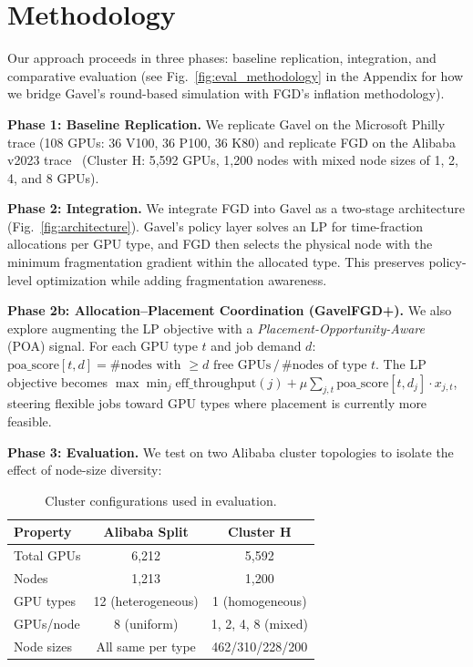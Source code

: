 \documentclass[conference]{IEEEtran}
\begin{document}
\section{Methodology}

Our approach proceeds in three phases: baseline replication, integration, and comparative evaluation (see Fig.~\ref{fig:eval_methodology} in the Appendix for how we bridge Gavel's round-based simulation with FGD's inflation methodology).

\textbf{Phase 1: Baseline Replication.}
We replicate Gavel on the Microsoft Philly trace (108 GPUs: 36 V100, 36 P100, 36 K80) and replicate FGD on the Alibaba v2023 trace~\cite{ALIBABA} (Cluster H: 5,592 GPUs, 1,200 nodes with mixed node sizes of 1, 2, 4, and 8 GPUs).

\textbf{Phase 2: Integration.}
We integrate FGD into Gavel as a two-stage architecture (Fig.~\ref{fig:architecture}).
Gavel's policy layer solves an LP for time-fraction allocations per GPU type, and FGD then selects the physical node with the minimum fragmentation gradient within the allocated type.
This preserves policy-level optimization while adding fragmentation awareness.

\textbf{Phase 2b: Allocation--Placement Coordination (GavelFGD+).}
We also explore augmenting the LP objective with a \textit{Placement-Opportunity-Aware} (POA) signal.
For each GPU type $t$ and job demand $d$:
$\text{poa\_score}[t,d] = {\#\text{nodes with } \ge d \text{ free GPUs}}\,/\,{\#\text{nodes of type } t}$.
The LP objective becomes
$\max \min_j \text{eff\_throughput}(j) + \mu \sum_{j,t} \text{poa\_score}[t,d_j] \cdot x_{j,t}$,
steering flexible jobs toward GPU types where placement is currently more feasible.

\textbf{Phase 3: Evaluation.}
We test on two Alibaba cluster topologies to isolate the effect of node-size diversity:

\begin{table}[h]
\centering
\caption{Cluster configurations used in evaluation.}
\label{tab:clusters}
\begin{tabular}{lcc}
\toprule
\textbf{Property} & \textbf{Alibaba Split} & \textbf{Cluster H} \\
\midrule
Total GPUs & 6,212 & 5,592 \\
Nodes & 1,213 & 1,200 \\
GPU types & 12 (heterogeneous) & 1 (homogeneous) \\
GPUs/node & 8 (uniform) & 1, 2, 4, 8 (mixed) \\
Node sizes & All same per type & 462/310/228/200 \\
\bottomrule
\end{tabular}
\end{table}
\end{document}
